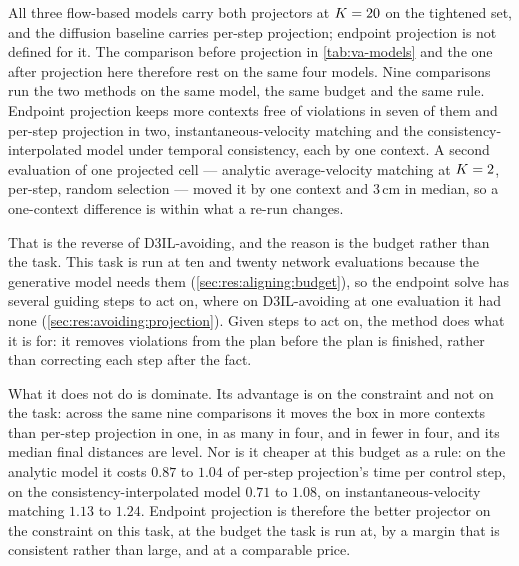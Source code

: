 All three flow-based models carry both projectors at $K=20$ on the tightened set, and the diffusion
baseline carries per-step projection; endpoint projection is not defined for it. The comparison before
projection in \autoref{tab:va-models} and the one after projection here therefore rest on the same four
models.
Nine comparisons run the two methods on the same model, the same budget and the same rule. Endpoint
projection keeps more contexts free of violations in seven of them and per-step projection in two,
instantaneous-velocity matching and the consistency-interpolated model under temporal consistency, each by
one context. A second evaluation of one projected cell --- analytic average-velocity matching at
$K=2$, per-step, random selection --- moved it by one context and $3$\,cm in median, so a one-context
difference is within what a re-run changes.

That is the reverse of D3IL-avoiding, and the reason is the budget rather than the task. This task is
run at ten and twenty network evaluations because the generative model needs them
(\autoref{sec:res:aligning:budget}), so the endpoint solve has several guiding steps to act on, where on
D3IL-avoiding at one evaluation it had none (\autoref{sec:res:avoiding:projection}). Given steps to act
on, the method does what it is for: it removes violations from the plan before the plan is finished,
rather than correcting each step after the fact.

What it does not do is dominate. Its advantage is on the constraint and not on the task: across the same
nine comparisons it moves the box in more contexts than per-step projection in one, in as many in four,
and in fewer in four, and its median final distances are level. Nor is it cheaper at this budget as a
rule: on the analytic model it costs $0.87$ to $1.04$ of per-step projection's time per control step, on
the consistency-interpolated model $0.71$ to $1.08$, on instantaneous-velocity matching $1.13$ to $1.24$.
Endpoint projection is therefore the better projector on the constraint on this task, at the budget the
task is run at, by a margin that is consistent rather than large, and at a comparable price.

